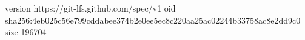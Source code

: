 version https://git-lfs.github.com/spec/v1
oid sha256:4eb025c56e799cddabee374b2e0ee5ec8c220aa25ac02244b33758ac8e2dd9c0
size 196704
